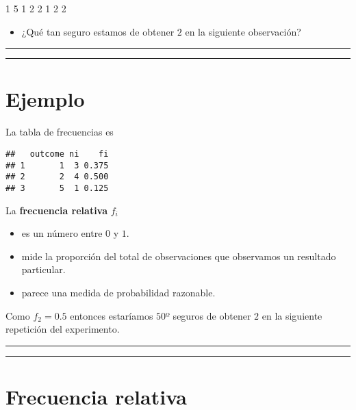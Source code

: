 \documentclass[
]{book}
\providecommand{\tightlist}{%
  \setlength{\itemsep}{0pt}\setlength{\parskip}{0pt}}
\begin{document}
1 5 1 2 2 1 2 2

\begin{itemize}
\tightlist
\item
  ¿Qué tan seguro estamos de obtener \(2\) en la siguiente observación?
\end{itemize}

\begin{center}\rule{0.5\linewidth}{0.5pt}\end{center}

\begin{center}\rule{0.5\linewidth}{0.5pt}\end{center}

\hypertarget{ejemplo-4}{%
\section{Ejemplo}\label{ejemplo-4}}

La tabla de frecuencias es

\begin{verbatim}
##   outcome ni    fi
## 1       1  3 0.375
## 2       2  4 0.500
## 3       5  1 0.125
\end{verbatim}

La \textbf{frecuencia relativa} \(f_i\)

\begin{itemize}
\tightlist
\item
  es un número entre \(0\) y \(1\).
\item
  mide la proporción del total de observaciones que observamos un resultado particular.
\item
  parece una medida de probabilidad razonable.
\end{itemize}

Como \(f_2=0.5\) entonces estaríamos \(50º%
\) seguros de obtener \(2\) en la siguiente repetición del experimento.

\begin{center}\rule{0.5\linewidth}{0.5pt}\end{center}

\begin{center}\rule{0.5\linewidth}{0.5pt}\end{center}

\hypertarget{frecuencia-relativa}{%
\section{Frecuencia relativa}\label{frecuencia-relativa}}
\end{document}
